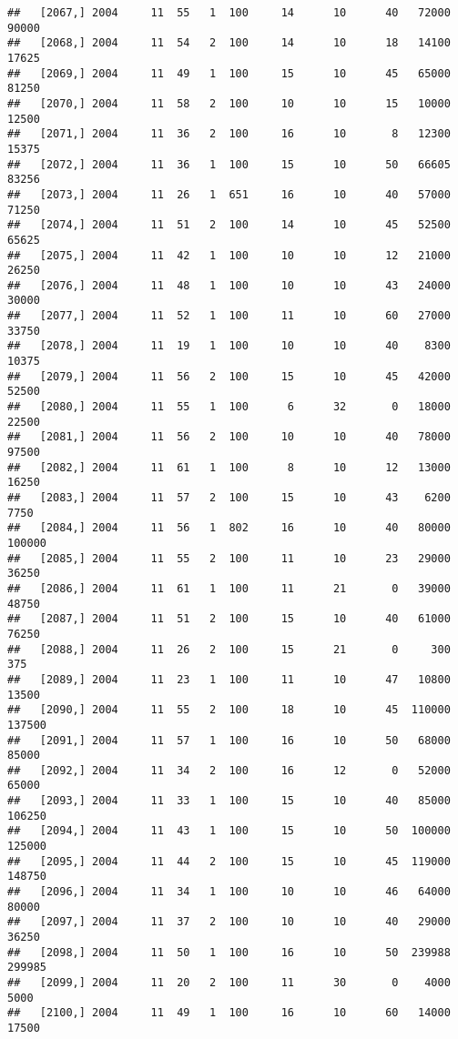 \documentclass{article}\usepackage[]{graphicx}\usepackage[]{color}
\makeatletter
\newenvironment{kframe}{%
 \def\at@end@of@kframe{}%
 \ifinner\ifhmode%
  \def\at@end@of@kframe{\end{minipage}}%
  \begin{minipage}{\columnwidth}%
 \fi\fi%
 \def\FrameCommand##1{\hskip\@totalleftmargin \hskip-\fboxsep
 \colorbox{shadecolor}{##1}\hskip-\fboxsep
     \hskip-\linewidth \hskip-\@totalleftmargin \hskip\columnwidth}%
 \MakeFramed {\advance\hsize-\width
   \@totalleftmargin\z@ \linewidth\hsize
   \@setminipage}}%
 {\par\unskip\endMakeFramed%
 \at@end@of@kframe}
\newenvironment{knitrout}{}{} %
\makeatother
\begin{document}
\begin{knitrout}
\begin{kframe}
\begin{verbatim}
##   [2067,] 2004     11  55   1  100     14      10      40   72000   90000
##   [2068,] 2004     11  54   2  100     14      10      18   14100   17625
##   [2069,] 2004     11  49   1  100     15      10      45   65000   81250
##   [2070,] 2004     11  58   2  100     10      10      15   10000   12500
##   [2071,] 2004     11  36   2  100     16      10       8   12300   15375
##   [2072,] 2004     11  36   1  100     15      10      50   66605   83256
##   [2073,] 2004     11  26   1  651     16      10      40   57000   71250
##   [2074,] 2004     11  51   2  100     14      10      45   52500   65625
##   [2075,] 2004     11  42   1  100     10      10      12   21000   26250
##   [2076,] 2004     11  48   1  100     10      10      43   24000   30000
##   [2077,] 2004     11  52   1  100     11      10      60   27000   33750
##   [2078,] 2004     11  19   1  100     10      10      40    8300   10375
##   [2079,] 2004     11  56   2  100     15      10      45   42000   52500
##   [2080,] 2004     11  55   1  100      6      32       0   18000   22500
##   [2081,] 2004     11  56   2  100     10      10      40   78000   97500
##   [2082,] 2004     11  61   1  100      8      10      12   13000   16250
##   [2083,] 2004     11  57   2  100     15      10      43    6200    7750
##   [2084,] 2004     11  56   1  802     16      10      40   80000  100000
##   [2085,] 2004     11  55   2  100     11      10      23   29000   36250
##   [2086,] 2004     11  61   1  100     11      21       0   39000   48750
##   [2087,] 2004     11  51   2  100     15      10      40   61000   76250
##   [2088,] 2004     11  26   2  100     15      21       0     300     375
##   [2089,] 2004     11  23   1  100     11      10      47   10800   13500
##   [2090,] 2004     11  55   2  100     18      10      45  110000  137500
##   [2091,] 2004     11  57   1  100     16      10      50   68000   85000
##   [2092,] 2004     11  34   2  100     16      12       0   52000   65000
##   [2093,] 2004     11  33   1  100     15      10      40   85000  106250
##   [2094,] 2004     11  43   1  100     15      10      50  100000  125000
##   [2095,] 2004     11  44   2  100     15      10      45  119000  148750
##   [2096,] 2004     11  34   1  100     10      10      46   64000   80000
##   [2097,] 2004     11  37   2  100     10      10      40   29000   36250
##   [2098,] 2004     11  50   1  100     16      10      50  239988  299985
##   [2099,] 2004     11  20   2  100     11      30       0    4000    5000
##   [2100,] 2004     11  49   1  100     16      10      60   14000   17500

\end{verbatim}
\end{kframe}
\end{knitrout}
\end{document}
